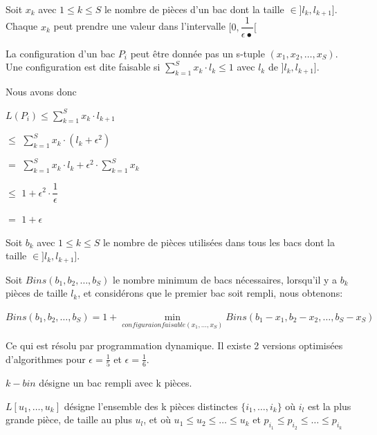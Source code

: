 \documentclass[a4paper,12pt]{report}
\theoremstyle{plain}				%
\theoremstyle{definition}				%
\begin{document}
Soit $x_k$ avec $1 \le k \le S$ le nombre de pièces d'un bac dont la
taille $\in ]l_k, l_{k+1}]$.
Chaque $x_k$ peut prendre une valeur dans l'intervalle
$[0,\dfrac{1}{\epsilon•}[$

La configuration d'un bac $P_i$ peut être donnée pas un s-tuple $(x_1, x_2, \ldots, x_S)$.
Une configuration est dite faisable si $\sum_{k=1}^{S}x_k \cdot l_k \le 1$ avec $l_k$ de $]l_k, l_{k+1}]$.

Nous avons donc

$L(P_i) \le \sum_{k=1}^{S}x_k \cdot l_{k+1}$

$\le$
$\sum_{k=1}^{S}x_k \cdot (l_k+\epsilon^2)$

$=$
$\sum_{k=1}^{S}x_k \cdot l_k  +  \epsilon^2 \cdot \sum_{k=1}^{S}x_k$

$\le$
$1 + \epsilon^2 \cdot \dfrac{1}{\epsilon}$

$=$
$1 + \epsilon$

\bigskip
Soit $b_k$ avec $1 \le k \le S$ le nombre de pièces utilisées dans tous les bacs dont la taille $\in ]l_k, l_{k+1}]$.

Soit $Bins(b_1, b_2, \ldots, b_S)$ le nombre minimum de bacs
nécessaires, lorsqu'il y a $b_k$ pièces de taille $l_k$, et
considérons que le premier bac soit rempli, nous obtenons:

$Bins(b_1, b_2, \ldots, b_S) = 1 + \underset{configuraion faisable (x_1, \ldots, x_S)}{\min} Bins(b_1-x_1, b_2-x_2, \ldots, b_S-x_S)$

Ce qui est résolu par programmation dynamique.
Il existe 2 versions optimisées d'algorithmes pour 
$\epsilon = \frac{1}{5}$ et 
$\epsilon = \frac{1}{6}$.

\bigskip

$k-bin$ désigne un bac rempli avec k pièces.

$L[u_1, \ldots, u_k]$ désigne l'ensemble des 
k pièces distinctes $\{i_1, \ldots, i_k\}$ 
où $i_l$ est la plus grande pièce, de taille au plus $u_l$, 
et où $u_1 \leq u_2 \leq \ldots \leq u_k$ et 
$p_{i_1} \leq p_{i_2} \leq \ldots \leq p_{i_k}$ 
\end{document}
